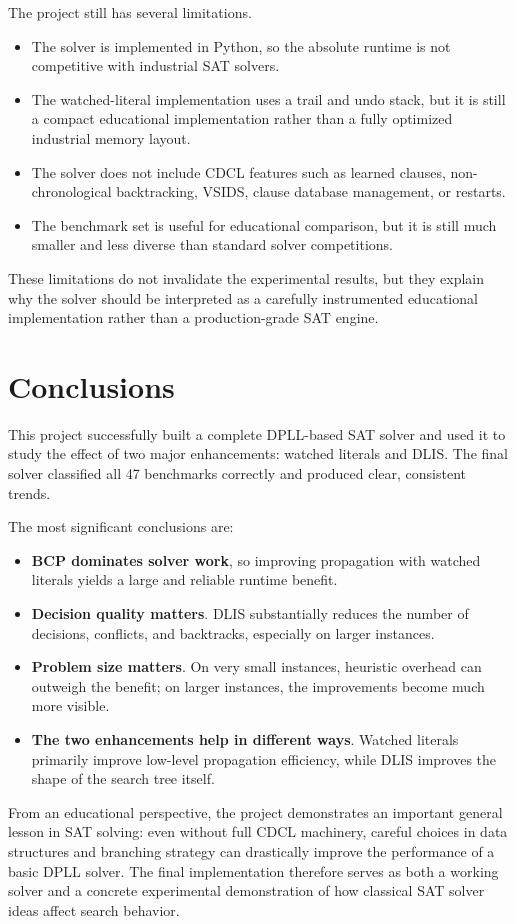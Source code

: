 \documentclass[11pt]{article}
\begin{document}
The project still has several limitations.

\begin{itemize}
    \item The solver is implemented in Python, so the absolute runtime is not
    competitive with industrial SAT solvers.
    \item The watched-literal implementation uses a trail and undo stack, but
    it is still a compact educational implementation rather than a fully
    optimized industrial memory layout.
    \item The solver does not include CDCL features such as learned clauses,
    non-chronological backtracking, VSIDS, clause database management, or
    restarts.
    \item The benchmark set is useful for educational comparison, but it is
    still much smaller and less diverse than standard solver competitions.
\end{itemize}

These limitations do not invalidate the experimental results, but they explain
why the solver should be interpreted as a carefully instrumented educational
implementation rather than a production-grade SAT engine.

\section{Conclusions}

This project successfully built a complete DPLL-based SAT solver and used it to
study the effect of two major enhancements: watched literals and DLIS. The
final solver classified all 47 benchmarks correctly and produced clear,
consistent trends.

The most significant conclusions are:

\begin{itemize}
    \item \textbf{BCP dominates solver work}, so improving propagation with
    watched literals yields a large and reliable runtime benefit.
    \item \textbf{Decision quality matters}. DLIS substantially reduces the
    number of decisions, conflicts, and backtracks, especially on larger
    instances.
    \item \textbf{Problem size matters}. On very small instances, heuristic
    overhead can outweigh the benefit; on larger instances, the improvements
    become much more visible.
    \item \textbf{The two enhancements help in different ways}. Watched
    literals primarily improve low-level propagation efficiency, while DLIS
    improves the shape of the search tree itself.
\end{itemize}

From an educational perspective, the project demonstrates an important general
lesson in SAT solving: even without full CDCL machinery, careful choices in
data structures and branching strategy can drastically improve the performance
of a basic DPLL solver. The final implementation therefore serves as both a
working solver and a concrete experimental demonstration of how classical SAT
solver ideas affect search behavior.
\end{document}
